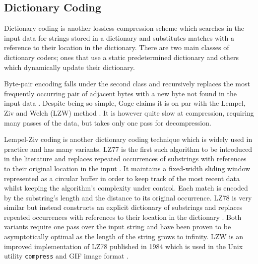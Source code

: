 
\subsection{Dictionary Coding}

Dictionary coding is another lossless compression scheme which searches in the input data for strings stored in a dictionary and substitutes matches with a reference to their location in the dictionary. There are two main classes of dictionary coders; ones that use a static predetermined dictionary and others which dynamically update their dictionary.

Byte-pair encoding falls under the second class and recursively replaces the
most frequently occurring pair of adjacent bytes with a new byte not found in
the input data \cite{byte-pair}. Despite being so simple, Gage claims it is on
par with the Lempel, Ziv and Welch (LZW) method \cite{lzw}. It is however quite
slow at compression, requiring many passes of the data, but takes only one pass
for decompression.

Lempel-Ziv coding is another dictionary coding technique which is widely used in
practice and has many variants. LZ77 is the first such algorithm to be
introduced in the literature and replaces repeated occurrences of substrings
with references to their original location in the input \cite{lz77}. It
maintains a fixed-width sliding window represented as a circular buffer in order
to keep track of the most recent data whilst keeping the algorithm's complexity
under control. Each match is encoded by the substring's length and the distance
to its original occurrence. LZ78 is very similar but instead constructs an
explicit dictionary of substrings and replaces repeated occurrences with
references to their location in the dictionary \cite{lz78}. Both variants
require one pass over the input string and have been proven to be asymptotically
optimal as the length of the string grows to infinity. LZW is an improved
implementation of LZ78 published in 1984 which is used in the Unix utility
\texttt{compress} and GIF image format \cite{lzw,compress,gif}.

